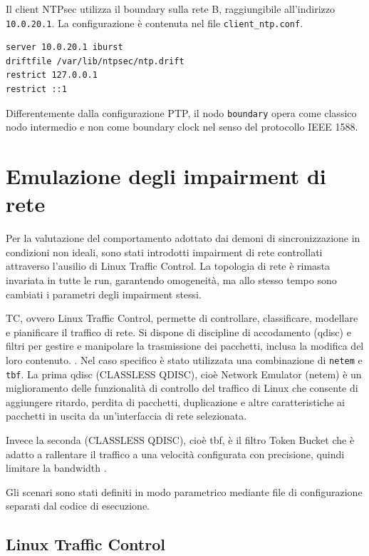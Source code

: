 Il client NTPsec utilizza il boundary sulla rete B, raggiungibile all'indirizzo \texttt{10.0.20.1}.
La configurazione è contenuta nel file \texttt{client\_ntp.conf}.

\begin{lstlisting}[language=bash,caption={Configurazione NTPsec del nodo clientntp.},label={lst:ntpsec-client}]
server 10.0.20.1 iburst
driftfile /var/lib/ntpsec/ntp.drift
restrict 127.0.0.1
restrict ::1
\end{lstlisting}

Differentemente dalla configurazione PTP, il nodo \texttt{boundary} opera come classico
nodo intermedio e non come boundary clock nel senso del protocollo IEEE 1588.

\section{Emulazione degli impairment di rete}

Per la valutazione del comportamento adottato dai demoni di sincronizzazione in condizioni
non ideali, sono stati introdotti impairment di rete controllati attraverso l'ausilio
di Linux Traffic Control. La topologia di rete è rimasta invariata in tutte le run,
garantendo omogeneità, ma allo stesso tempo sono cambiati i parametri degli impairment
stessi.

TC, ovvero Linux Traffic Control, permette di controllare, classificare, modellare
e pianificare il traffico di rete. Si dispone di discipline di accodamento (qdisc)
e filtri per gestire e manipolare la trasmissione dei pacchetti, inclusa la modifica
del loro contenuto. \cite{Chapter32Linux}. Nel caso specifico è stato utilizzata una
combinazione di \texttt{netem} e \texttt{tbf}. La prima qdisc (CLASSLESS QDISC), cioè
Network Emulator (netem) è un miglioramento delle funzionalità di controllo del traffico
di Linux che consente di aggiungere ritardo, perdita di pacchetti, duplicazione e
altre caratteristiche ai pacchetti in uscita da un'interfaccia di rete selezionata.
\cite{Tc8LinuxManual}

Invece la seconda (CLASSLESS QDISC), cioè tbf, è il filtro Token Bucket che è adatto
a rallentare il traffico a una velocità configurata con precisione, quindi
limitare la bandwidth . \cite{Tc8LinuxManual}

Gli scenari sono stati definiti in modo parametrico mediante file di configurazione
separati dal codice di esecuzione.

\subsection{Linux Traffic Control}

